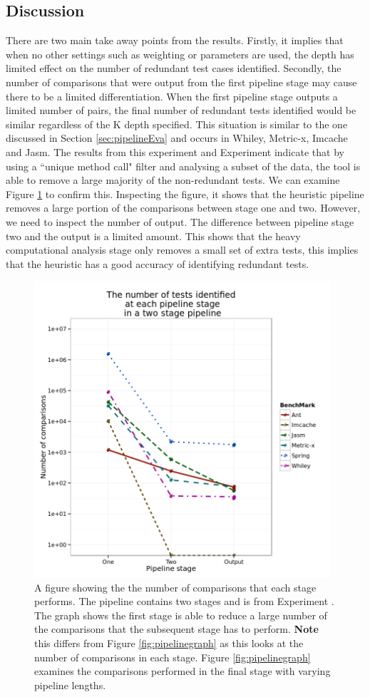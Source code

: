 \subsection{Discussion}
There are two main take away points from the results. Firstly, it implies that when no other settings such as weighting or parameters are used, the depth has limited effect on the number of redundant test cases identified. Secondly, the number of comparisons that were output from the first pipeline stage may cause there to be a limited differentiation. When the first pipeline stage outputs a limited number of pairs, the final number of redundant tests identified would be similar regardless of the K depth specified. This situation is similar to the one discussed in Section \ref{sec:pipelineEva} and occurs in Whiley, Metric-x, Imcache and Jasm. The results from this experiment and Experiment  indicate that by using a ``unique method call" filter and analysing a subset of the data, the tool is able to remove a large majority of the non-redundant tests. We can examine Figure \ref{fig:stagesinpipeline} to confirm this. Inspecting the figure, it shows that the heuristic pipeline removes a large portion of the comparisons between stage one and two. However, we need to inspect the number of output. The difference between pipeline stage two and the output is a limited amount. This shows that the heavy computational analysis stage only removes a small set of extra tests, this implies that the heuristic has a good accuracy of identifying redundant tests.
\begin{figure}[h]
\centering
\includegraphics[width=\textwidth,height=11cm]{stagesinpipeline.png}
\caption{A figure showing the the number of comparisons that each stage performs. The pipeline contains two stages and is from Experiment . The graph shows the first stage is able to reduce a large number of the comparisons that the subsequent stage has to perform. \textbf{Note} this differs from Figure \ref{fig:pipelinegraph} as this looks at the number of comparisons in each stage. Figure \ref{fig:pipelinegraph} examines the comparisons performed in the final stage with varying pipeline lengths.}
\label{fig:stagesinpipeline}
\end{figure}

